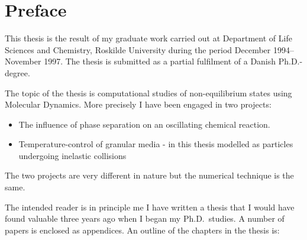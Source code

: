 
\chapter*{Preface}
This thesis is the result of my graduate work carried out at Department
of Life Sciences and Chemistry, Roskilde University during the period
December 1994--November 1997. The thesis is submitted as a partial
fulfilment of a Danish Ph.D.-degree.

The topic of the thesis is computational studies of non-equilibrium
states using Molecular Dynamics. More precisely I have been engaged in
two projects:

\begin{itemize}
\item The influence of phase separation on an oscillating chemical
  reaction.
\item Temperature-control of granular media - in this thesis modelled as
  particles undergoing inelastic collisions
\end{itemize}

The two projects are very different in nature but the numerical
technique is the same.

The intended reader is in principle me \ie I have written a thesis that
I would have found valuable three years ago when I began my Ph.D.\
studies. A number of papers is enclosed as appendices. An outline of
the chapters in the thesis is: 

